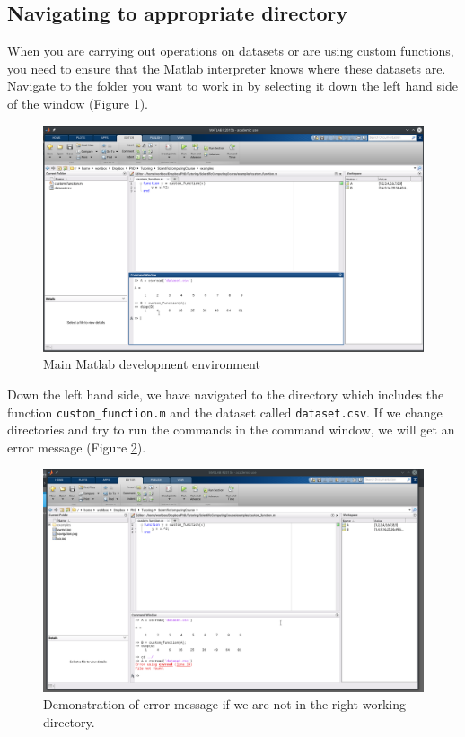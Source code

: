 \documentclass[12pt]{article}
\begin{document}
\subsection{Navigating to appropriate directory}
When you are carrying out operations on datasets or are using custom functions, you need to ensure that the Matlab interpreter knows where these datasets are. Navigate to the folder you want to work in by selecting it down the left hand side of the window (Figure \ref{fig:mde}). \\
\begin{figure}[ht]
\centering
\includegraphics[scale=0.4]{navigation.png}
\caption{Main Matlab development environment}
\label{fig:mde}
\end{figure}

Down the left hand side, we have navigated to the directory which includes the function \texttt{custom\_function.m} and the dataset called \texttt{dataset.csv}. If we change directories and try to run the commands in the command window, we will get an error message (Figure \ref{fig:mde2}).\\
\begin{figure}[ht]
\centering
\includegraphics[scale=0.4]{navigation2.png}
\caption{Demonstration of error message if we are not in the right working directory.}
\label{fig:mde2}
\end{figure}
\end{document}
